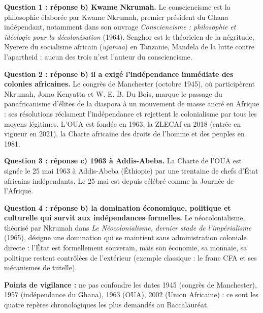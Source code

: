 \documentclass[11pt]{article}
\begin{document}
\begin{corrige}

\textbf{Question 1 : réponse b) Kwame Nkrumah.} Le consciencisme est la philosophie élaborée par Kwame Nkrumah, premier président du Ghana indépendant, notamment dans son ouvrage \emph{Consciencisme : philosophie et idéologie pour la décolonisation} (1964). Senghor est le théoricien de la négritude, Nyerere du socialisme africain (\emph{ujamaa}) en Tanzanie, Mandela de la lutte contre l'apartheid : aucun des trois n'est l'auteur du consciencisme.

\textbf{Question 2 : réponse b) il a exigé l'indépendance immédiate des colonies africaines.} Le congrès de Manchester (octobre 1945), où participèrent Nkrumah, Jomo Kenyatta et W. E. B. Du Bois, marque le passage du panafricanisme d'élites de la diaspora à un mouvement de masse ancré en Afrique : ses résolutions réclament l'indépendance et rejettent le colonialisme par tous les moyens légitimes. L'OUA est fondée en 1963, la ZLECAf en 2018 (entrée en vigueur en 2021), la Charte africaine des droits de l'homme et des peuples en 1981.

\textbf{Question 3 : réponse c) 1963 à Addis-Abeba.} La Charte de l'OUA est signée le 25 mai 1963 à Addis-Abeba (Éthiopie) par une trentaine de chefs d'État africains indépendants. Le 25 mai est depuis célébré comme la Journée de l'Afrique.

\textbf{Question 4 : réponse b) la domination économique, politique et culturelle qui survit aux indépendances formelles.} Le néocolonialisme, théorisé par Nkrumah dans \emph{Le Néocolonialisme, dernier stade de l'impérialisme} (1965), désigne une domination qui se maintient sans administration coloniale directe : l'État est formellement souverain, mais son économie, sa monnaie, sa politique restent contrôlées de l'extérieur (exemple classique : le franc CFA et ses mécanismes de tutelle).

\textbf{Points de vigilance :} ne pas confondre les dates 1945 (congrès de Manchester), 1957 (indépendance du Ghana), 1963 (OUA), 2002 (Union Africaine) : ce sont les quatre repères chronologiques les plus demandés au Baccalauréat.
\end{corrige}
\end{document}
